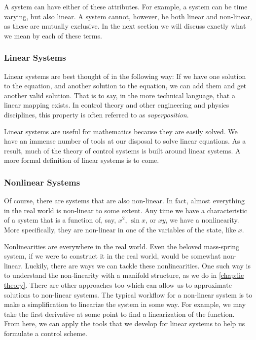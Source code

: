 A system can have either of these attributes. For example, a system can be time varying, but also linear. A system cannot, however, be both linear and non-linear, as these are mutually exclusive. In the next section we will discuss exactly what we mean by each of these terms.

\subsubsection{Linear Systems}
Linear systems are best thought of in the following way: If we have one solution to the equation, and another solution to the equation, we can add them and get another valid solution. That is to say, in the more technical language, that a linear mapping exists. In control theory and other engineering and physics disciplines, this property is often referred to as \textit{superposition}.

Linear systems are useful for mathematics because they are easily solved. We have an immense number of tools at our disposal to solve linear equations. As a result, much of the theory of control systems is built around linear systems. A more formal definition of linear systems is to come.

\subsubsection{Nonlinear Systems}
Of course, there are systems that are also non-linear. In fact, almost everything in the real world is non-linear to some extent. Any time we have a characteristic of a system that is a function of, say, $x^2$, $\sin x$, or $xy$, we have a nonlinearity. More specifically, they are non-linear in one of the variables of the state, like $x$.

Nonlinearities are everywhere in the real world. Even the beloved mass-spring system, if we were to construct it in the real world, would be somewhat non-linear. Luckily, there are ways we can tackle these nonlinearities. One such way is to understand the non-linearity with a manifold structure, as we do in \autoref{chap:lie theory}. There are other approaches too which can allow us to approximate solutions to non-linear systems. The typical workflow for a non-linear system is to make a simplification to linearize the system in some way. For example, we may take the first derivative at some point to find a linearization of the function. From here, we can apply the tools that we develop for linear systems to help us formulate a control scheme.

